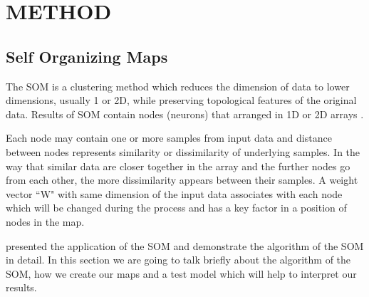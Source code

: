 \documentclass[useAMS,usenatbib]{mn2e}
\newcommand \boldit {\textbf{\textit{}}}
\begin{document}


\section{METHOD}
\label{sec: method}
 \subsection{Self Organizing Maps}
 \label{sec: som}
 
 The SOM is a clustering method which reduces the dimension of data to lower dimensions, usually 1 or 2D, while preserving topological features of the original data.
 Results of SOM contain nodes (neurons) that arranged in 1D or 2D arrays \citep{Kohonen98}. 
 
 Each node may contain one or more samples from input data and distance between nodes represents similarity or dissimilarity of underlying samples. 
 In the way that similar data are closer together in the array and the further nodes go from each other, the more dissimilarity appears between their samples.
 A weight vector ``\boldit{W}" with same dimension of the input data associates with each node which will be changed during the process and has a key factor in a position of nodes in the map.
 
 \cite{Geach12} presented the application of the SOM and demonstrate the algorithm of the SOM in detail. In this section we are going to talk briefly about the algorithm of the SOM, how we create our maps and a test model which will help to interpret our results. 
\end{document}
